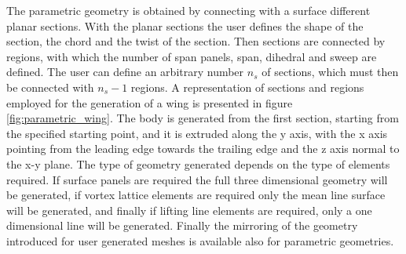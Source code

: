 The parametric geometry is obtained by connecting with a surface different planar sections. 
With the planar sections the user defines the shape of the section, the chord and the twist of the section. 
Then sections are connected by regions, with which the number of span panels, span, dihedral and sweep are defined. 
The user can define an arbitrary number $n_s$ of sections, which must then be connected with $n_s-1$ regions. 
A representation of sections and regions employed for the generation of a wing is presented in figure \ref{fig:parametric_wing}. 
The body is generated from the first section, starting from the specified starting point, and it is extruded along the y axis, 
with the x axis pointing from the leading edge towards the trailing edge and the z axis normal to the x-y plane. 
The type of geometry generated depends on the type of elements required. If surface panels are required the full 
three dimensional geometry will be generated, if vortex lattice elements are required only the mean line 
surface will be generated, and finally if lifting line elements are required, only a one dimensional line will be generated. 
Finally the mirroring of the geometry introduced for user generated meshes is available also for parametric geometries.

